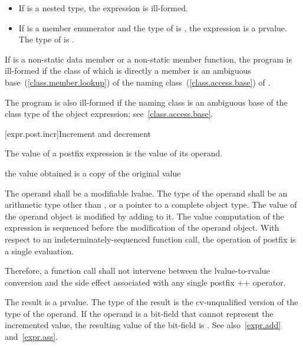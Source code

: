 \begin{itemize}
\item If  is a nested type, the expression  is
ill-formed.

\item If  is a member enumerator and the type of 
is , the expression  is a prvalue. The type of
 is .
\end{itemize}

\pnum
If  is a non-static data member or a non-static member
function, the program is ill-formed if the class of which  is
directly a member is an ambiguous base~(\ref{class.member.lookup}) of
the naming class~(\ref{class.access.base}) of .
\begin{note}
The program is also ill-formed if the naming class is an ambiguous base of the class type
of the object expression; see~\ref{class.access.base}.
\end{note}

[expr.post.incr]{Increment and decrement}

\pnum
{}%
%
%
%
The value of a postfix \tcode{++} expression is the value of its
operand.
\begin{note}
the value obtained is a copy of the original value
\end{note}
The operand shall be a modifiable lvalue. The type of the operand shall
be an arithmetic type other than \cv{} ,
or a pointer to a complete object type. The value
of the operand object is modified by adding  to it.
The
%
value computation of the \tcode{++} expression is sequenced before the
modification of the operand object. With respect to an
indeterminately-sequenced function call, the operation of postfix
\tcode{++} is
a single evaluation.
\begin{note}
Therefore, a function call shall not intervene between the
lvalue-to-rvalue conversion and the side effect associated with any
single postfix ++ operator.
\end{note}
The result is a prvalue. The type of the result is the cv-unqualified
version of the type of the operand.
If the operand is a bit-field that cannot represent the incremented value, the
resulting value of the bit-field is
.
See also~\ref{expr.add}
and~\ref{expr.ass}.

